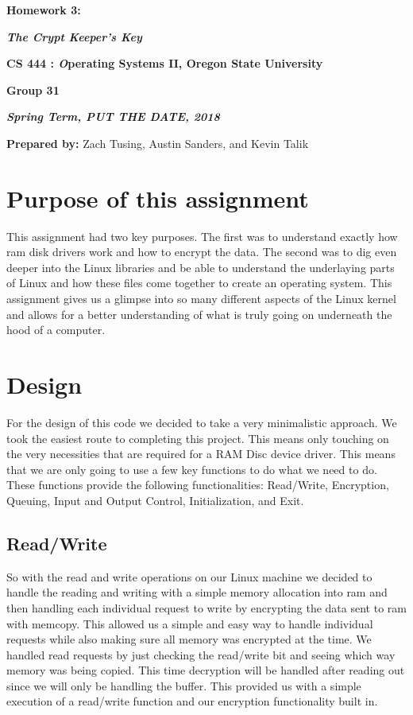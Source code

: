\documentclass[onecolumn, draftclsnofoot,10pt, compsoc]{IEEEtran}
\def \GroupMemberOne{			Zach Tusing}
\def \GroupMemberTwo{			Austin Sanders}
\def \GroupMemberThree{			Kevin Talik}
\begin{document}
 	\begin{center}
	\huge\bf{ Homework 3:} 
   
    \large\textbf{\textit{ The Crypt Keeper's Key }}\par
     
    
    
	\small{\bf CS 444 : \textit Operating Systems II, Oregon State University}\par
    \small{\bf{Group 31}}
    
    
    {\bf\textit{ Spring Term, PUT THE DATE, 2018} }
    
    
    {\small {\bf Prepared by:} \GroupMemberOne, \GroupMemberTwo, and \GroupMemberThree }
        \end{center}
 		\vfill

       \pagebreak
       \section{ Purpose of this assignment }
		This assignment had two key purposes. The first was to understand exactly how ram disk drivers work and how to encrypt the data. The second was to dig even deeper into the Linux libraries and be able to understand the underlaying parts of Linux and how these files come together to create an operating system. This assignment gives us a glimpse into so many different aspects of the Linux kernel and allows for a better understanding of what is truly going on underneath the hood of a computer.
	\section{ Design }
    
    	For the design of this code we decided to take a very minimalistic approach. We took the easiest route to completing this project. This means only touching on the very necessities that are required for a RAM Disc device driver. This means that we are only going to use a few key functions to do what we need to do. These functions provide the following functionalities: Read/Write, Encryption, Queuing, Input and Output Control, Initialization, and Exit.
        
	\subsection{Read/Write}
    So with the read and write operations on our Linux machine we decided to handle the reading and writing with a simple memory allocation into ram and then handling each individual request to write by encrypting the data sent to ram with memcopy. This allowed us a simple and easy way to handle individual requests while also making sure all memory was encrypted at the time. We handled read requests by just checking the read/write bit and seeing which way memory was being copied. This time decryption will be handled after reading out since we will only be handling the buffer. This provided us with a simple execution of a read/write function and our encryption functionality built in.
\end{document}
